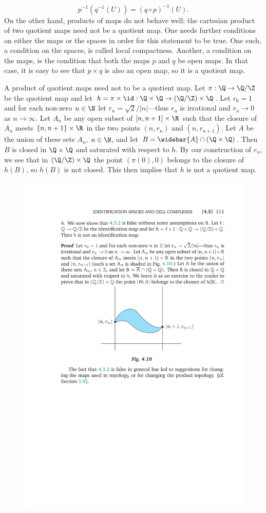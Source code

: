 \[p^{-1}(q^{-1}(U))=(q\circ p)^{-1}(U).\]
On the other hand, products of maps do not behave well; the cartesian product of two quotient maps need not be a quotient map. One needs further conditions on either the maps or the spaces in order for this statement to be true. One such, a condition on the spaces, is called local compactness. Another, a condition on the maps, is the condition that both the maps $p$ and $q$ be open maps. In that case, it is easy to see that $p\times q$ is also an open map, so it is a quotient map.
\begin{example}
A product of quotient maps need not to be a quotient map. Let $\pi:\Q\to\Q/\Z$ be the quotient map and let $h=\pi\times\id:\Q\times\Q\to(\Q/\Z)\times\Q$. Let $r_0=1$ and for each non-zero $n\in\N$ let $r_n=\sqrt{2}/|n|$---thus $r_n$ is irrational and $r_n\to 0$ as $n\to\infty$. Let $A_n$ be any open subset of $[n,n+1]\times\R$
such that the closure of $A_n$ meets $\{n,n+1\}\times\R$ in the two points $(n,r_n)$ and $(n,r_{n+1})$. Let $A$ be the union of these sets $A_n$, $n\in\N$, and let 
$B=\widebar{A}\cap (\Q\times\Q)$. Then $B$ is closed in $\Q\times\Q$ and saturated with respect to $h$. By our construction of $r_n$, we see that in 
$(\Q/\Z)\times\Q$ the point $(\pi(0),0)$ belongs to the closure of $h(B)$, so $h(B)$ is not closed. This then implies that $h$ is not a quotient map.
\begin{figure}[htbp]
\centering
\includegraphics{pictures/quotient-product-no}

\end{figure}
\end{example}
